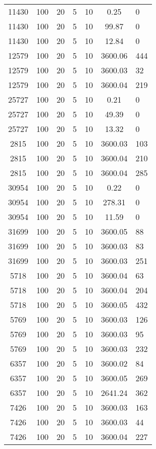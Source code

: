 \begin{tabular}[center]{cccccc}
11430   & 100 & 20 & 5 & 10 & 0.25    & 0   \\
11430   & 100 & 20 & 5 & 10 & 99.87   & 0   \\
11430   & 100 & 20 & 5 & 10 & 12.84   & 0   \\
12579   & 100 & 20 & 5 & 10 & 3600.06 & 444 \\
12579   & 100 & 20 & 5 & 10 & 3600.03 & 32  \\
12579   & 100 & 20 & 5 & 10 & 3600.04 & 219 \\
25727   & 100 & 20 & 5 & 10 & 0.21    & 0   \\
25727   & 100 & 20 & 5 & 10 & 49.39   & 0   \\
25727   & 100 & 20 & 5 & 10 & 13.32   & 0   \\
2815    & 100 & 20 & 5 & 10 & 3600.03 & 103 \\
2815    & 100 & 20 & 5 & 10 & 3600.04 & 210 \\
2815    & 100 & 20 & 5 & 10 & 3600.04 & 285 \\
30954   & 100 & 20 & 5 & 10 & 0.22    & 0   \\
30954   & 100 & 20 & 5 & 10 & 278.31  & 0   \\
30954   & 100 & 20 & 5 & 10 & 11.59   & 0   \\
31699   & 100 & 20 & 5 & 10 & 3600.05 & 88  \\
31699   & 100 & 20 & 5 & 10 & 3600.03 & 83  \\
31699   & 100 & 20 & 5 & 10 & 3600.03 & 251 \\
5718    & 100 & 20 & 5 & 10 & 3600.04 & 63  \\
5718    & 100 & 20 & 5 & 10 & 3600.04 & 204 \\
5718    & 100 & 20 & 5 & 10 & 3600.05 & 432 \\
5769    & 100 & 20 & 5 & 10 & 3600.03 & 126 \\
5769    & 100 & 20 & 5 & 10 & 3600.03 & 95  \\
5769    & 100 & 20 & 5 & 10 & 3600.03 & 232 \\
6357    & 100 & 20 & 5 & 10 & 3600.02 & 84  \\
6357    & 100 & 20 & 5 & 10 & 3600.05 & 269 \\
6357    & 100 & 20 & 5 & 10 & 2641.24 & 362 \\
7426    & 100 & 20 & 5 & 10 & 3600.03 & 163 \\
7426    & 100 & 20 & 5 & 10 & 3600.03 & 44  \\
7426    & 100 & 20 & 5 & 10 & 3600.04 & 227 \\

\end{tabular}
